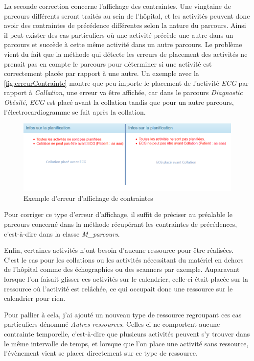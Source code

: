 \documentclass[noposter]{polytech/polytech}
\begin{document}
La seconde correction concerne l'affichage des contraintes. Une vingtaine de parcours différents seront traités au sein de l'hôpital, et les activités peuvent donc avoir des contraintes de précédence différentes selon la nature du parcours. Ainsi il peut exister des cas particuliers où une activité précède une autre dans un parcours et succède à cette même activité dans un autre parcours. Le problème vient du fait que la méthode qui détecte les erreurs de placement des activités ne prenait pas en compte le parcours pour déterminer si une activité est correctement placée par rapport à une autre. Un exemple avec la \autoref{fig:erreurContrainte} montre que peu importe le placement de l'activité \textit{ECG} par rapport à \textit{Collation}, une erreur va être affichée, car dans le parcours \textit{Diagnostic Obésité}, \textit{ECG} est placé avant la collation tandis que pour un autre parcours, l'électrocardiogramme se fait après la collation. 

\begin{figure}
	\includegraphics[scale=0.75]{images/erreurContrainte}
	\caption{Exemple d'erreur d'affichage de contraintes}
	\label{fig:erreurContrainte}
\end{figure}

Pour corriger ce type d'erreur d'affichage, il suffit de préciser au préalable le parcours concerné dans la méthode récupérant les contraintes de précédences, c'est-à-dire  dans la classe \textit{M\_parcours}. 

Enfin, certaines activités n'ont besoin d'aucune ressource pour être réalisées. C'est le cas pour les collations ou les activités nécessitant du matériel en dehors de l'hôpital comme des échographies ou des scanners par exemple. Auparavant lorsque l'on faisait glisser ces activités sur le calendrier, celle-ci était placée sur la ressource où l'activité est relâchée, ce qui occupait donc une ressource sur le calendrier pour rien. 

Pour pallier à cela, j'ai ajouté un nouveau type de ressource regroupant ces cas particuliers dénommé \textit{Autres ressources}. Celles-ci ne comportent aucune contrainte temporelle, c'est-à-dire que plusieurs activités peuvent s'y trouver dans le même intervalle de temps, et lorsque que l'on place une activité sans ressource, l'évènement vient se placer directement sur ce type de ressource. 
\end{document}
